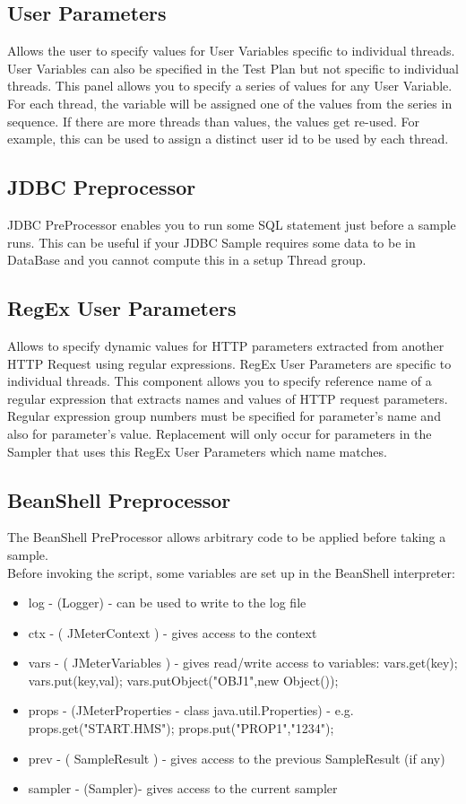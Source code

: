 \documentclass[12pt]{book}
\begin{document}
  \subsection{User Parameters}
  Allows the user to specify values for User Variables specific to individual threads. User Variables can also be specified in the Test Plan but not 
  specific to individual threads. This panel allows you to specify a series of values for any User Variable. For each thread, the variable will be assigned
  one of the values from the series in sequence. If there are more threads than values, the values get re-used. For example, this can be used to assign a 
  distinct user id to be used by each thread. 
  
  \subsection{JDBC Preprocessor}
  JDBC PreProcessor enables you to run some SQL statement just before a sample runs. This can be useful if your JDBC Sample requires some data to be 
  in DataBase and you cannot compute this in a setup Thread group.
  
  \subsection{RegEx User Parameters}
  Allows to specify dynamic values for HTTP parameters extracted from another HTTP Request using regular expressions. RegEx User Parameters are specific
  to individual threads. This component allows you to specify reference name of a regular expression that extracts names and values of HTTP request parameters.
  Regular expression group numbers must be specified for parameter's name and also for parameter's value. Replacement will only occur for parameters in the 
  Sampler that uses this RegEx User Parameters which name matches.
  
  \subsection{BeanShell Preprocessor}
  The BeanShell PreProcessor allows arbitrary code to be applied before taking a sample. \\
  
  Before invoking the script, some variables are set up in the BeanShell interpreter: 
  \begin{itemize}
   \item log - (Logger) - can be used to write to the log file 
   \item ctx - ( JMeterContext ) - gives access to the context 
   \item vars - ( JMeterVariables ) - gives read/write access to variables: vars.get(key); vars.put(key,val); vars.putObject("OBJ1",new Object()); 
   \item props - (JMeterProperties - class java.util.Properties) - e.g. props.get("START.HMS"); props.put("PROP1","1234"); 
   \item prev - ( SampleResult ) - gives access to the previous SampleResult (if any) 
   \item sampler - (Sampler)- gives access to the current sampler 
  \end{itemize}
  
\end{document}
